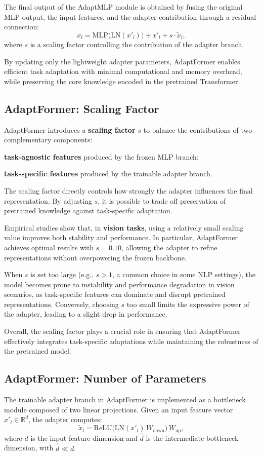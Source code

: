 The final output of the AdaptMLP module is obtained by fusing the original MLP output, the input
features, and the adapter contribution through a residual connection:
\[
x_l = \text{MLP}\bigl(\text{LN}(x'_l)\bigr) + x'_l + s \cdot \tilde{x}_l,
\]
where $s$ is a scaling factor controlling the contribution of the adapter branch.

By updating only the lightweight adapter parameters, AdaptFormer enables efficient task
adaptation with minimal computational and memory overhead, while preserving the core knowledge
encoded in the pretrained Transformer.

\subsection{AdaptFormer: Scaling Factor}
AdaptFormer introduces a \textbf{scaling factor} $s$ to balance the contributions of two
complementary components:
\begin{compactitemize}
    \item \textbf{task-agnostic features} produced by the frozen MLP branch;
    \item \textbf{task-specific features} produced by the trainable adapter branch.
\end{compactitemize}

The scaling factor directly controls how strongly the adapter influences the final
representation. By adjusting $s$, it is possible to trade off preservation of pretrained
knowledge against task-specific adaptation.

Empirical studies show that, in \textbf{vision tasks}, using a relatively small scaling value
improves both stability and performance. In particular, AdaptFormer achieves optimal results
with $s = 0.10$, allowing the adapter to refine representations without overpowering the frozen
backbone.

When $s$ is set too large (e.g., $s > 1$, a common choice in some NLP settings), the model becomes
prone to instability and performance degradation in vision scenarios, as task-specific features
can dominate and disrupt pretrained representations. Conversely, choosing $s$ too small limits
the expressive power of the adapter, leading to a slight drop in performance.

Overall, the scaling factor plays a crucial role in ensuring that AdaptFormer effectively
integrates task-specific adaptations while maintaining the robustness of the pretrained model.

\subsection{AdaptFormer: Number of Parameters}
The trainable adapter branch in AdaptFormer is implemented as a bottleneck module composed of
two linear projections. Given an input feature vector $x'_l \in \mathbb{R}^{d}$, the adapter
computes:
\[
\tilde{x}_l = \text{ReLU}\bigl(\text{LN}(x'_l)\, W_{\text{down}}\bigr)\, W_{\text{up}},
\]
where $d$ is the input feature dimension and $\hat{d}$ is the intermediate bottleneck dimension,
with $\hat{d} \ll d$.

